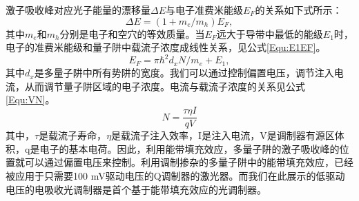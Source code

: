 激子吸收峰对应光子能量的漂移量$\Delta E$与电子准费米能级$E_F$的关系如下式所示\cite{livescu1988free}：
\begin{equation}
\label{Equ:DEEF}
\Delta E = (1+m_e/m_h)E_F,
\end{equation}
其中$m_e$和$m_h$分别是电子和空穴的等效质量。当$E_F$远大于导带中最低的能级$E_1$时，电子的准费米能级和量子阱中载流子浓度成线性关系，见公式\ref{Equ:E1EF}\cite{coldren1995diode}。
\begin{equation}
\label{Equ:E1EF}
E_F = \pi\hbar^2d_xN/m_e+E_1,
\end{equation}
其中$d_x$是多量子阱中所有势阱的宽度。我们可以通过控制偏置电压，调节注入电流，从而调节量子阱区域的电子浓度。电流与载流子浓度的关系见公式\ref{Equ:VN}。
\begin{equation}
\label{Equ:VN}
N = \frac{\tau\eta I}{qV}
\end{equation}
其中，$\tau$是载流子寿命，$\eta$是载流子注入效率，I是注入电流，V是调制器有源区体积，q是电子的基本电荷。因此，利用能带填充效应，多量子阱的激子吸收峰的位置就可以通过偏置电压来控制。利用调制掺杂的多量子阱中的能带填充效应，已经被应用于只需要100 mV驱动电压的Q调制器的激光器\cite{kalinovsky1993free}。而我们在此展示的低驱动电压的电吸收光调制器是首个基于能带填充效应的光调制器。

